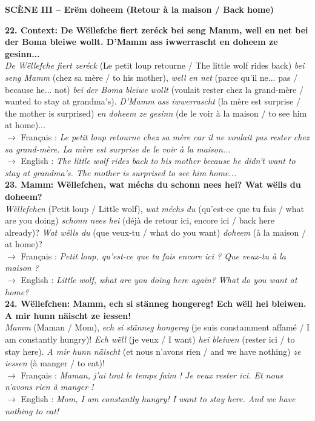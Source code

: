 \noindent\textbf{SCÈNE III -- Erëm doheem (Retour à la maison / Back home)}

\noindent\textbf{22. Context: De Wëllefche fiert zeréck bei seng Mamm, well en net bei der Boma bleiwe wollt. D'Mamm ass iwwerrascht en doheem ze gesinn...}\\
\textit{De Wëllefche fiert zeréck} (Le petit loup retourne / The little wolf rides back) \textit{bei seng Mamm} (chez sa mère / to his mother), \textit{well en net} (parce qu'il ne... pas / because he... not) \textit{bei der Boma bleiwe wollt} (voulait rester chez la grand-mère / wanted to stay at grandma's). \textit{D'Mamm ass iwwerrascht} (la mère est surprise / the mother is surprised) \textit{en doheem ze gesinn} (de le voir à la maison / to see him at home)...\\
$\rightarrow$ Français : \textit{Le petit loup retourne chez sa mère car il ne voulait pas rester chez sa grand-mère. La mère est surprise de le voir à la maison...}\\
$\rightarrow$ English : \textit{The little wolf rides back to his mother because he didn't want to stay at grandma's. The mother is surprised to see him home...}\\[0.5em]

\noindent\textbf{23. Mamm: Wëllefchen, wat méchs du schonn nees hei? Wat wëlls du doheem?}\\
\textit{Wëllefchen} (Petit loup / Little wolf), \textit{wat méchs du} (qu'est-ce que tu fais / what are you doing) \textit{schonn nees hei} (déjà de retour ici, encore ici / back here already)? \textit{Wat wëlls du} (que veux-tu / what do you want) \textit{doheem} (à la maison / at home)?\\
$\rightarrow$ Français : \textit{Petit loup, qu'est-ce que tu fais encore ici ? Que veux-tu à la maison ?}\\
$\rightarrow$ English : \textit{Little wolf, what are you doing here again? What do you want at home?}\\[0.5em]

\noindent\textbf{24. Wëllefchen: Mamm, ech si stänneg hongereg! Ech wëll hei bleiwen. A mir hunn näischt ze iessen!}\\
\textit{Mamm} (Maman / Mom), \textit{ech si stänneg hongereg} (je suis constamment affamé / I am constantly hungry)! \textit{Ech wëll} (je veux / I want) \textit{hei bleiwen} (rester ici / to stay here). \textit{A mir hunn näischt} (et nous n'avons rien / and we have nothing) \textit{ze iessen} (à manger / to eat)!\\
$\rightarrow$ Français : \textit{Maman, j'ai tout le temps faim ! Je veux rester ici. Et nous n'avons rien à manger !}\\
$\rightarrow$ English : \textit{Mom, I am constantly hungry! I want to stay here. And we have nothing to eat!}\\[0.5em]

